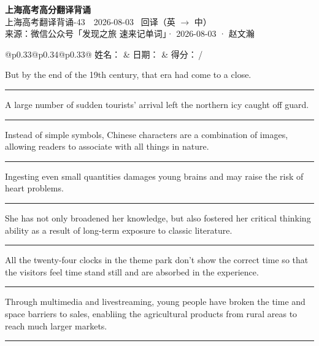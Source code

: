 \documentclass[11pt,a4paper]{article}
\newcommand{\num}[1]{\makebox[1.9em][r]{#1.}\hspace{0.3em}}
\newcommand{\wline}{\noindent\rule{\linewidth}{0.4pt}}
\begin{document}
\pagestyle{plain}
\begin{center}
{\LARGE\bfseries 上海高考高分翻译背诵 }\\[0.25em]
{\large 上海高考翻译背诵-43　2026-08-03 \quad\ 回译（英 $\to$ 中）}\\[0.35em]
{\footnotesize 来源：微信公众号「发现之旅 速来记单词」· 2026-08-03 · 赵文瀚}
\end{center}

\vspace{0.4em}
\noindent\begin{tabular}{@{}p{0.33\textwidth}@{}p{0.34\textwidth}@{}p{0.33\textwidth}@{}}
姓名：\underline{\hspace{2.0cm}} & 日期：\underline{\hspace{2.0cm}} & 得分：\underline{\hspace{1.4cm}}\,/ \\
\end{tabular}

\vspace{0.5em}

\vspace{0.8em}
\num{1}But by the end of the 19th century, that era had come to a close.

\vspace{0.25em}

\wline

\num{2}A large number of sudden tourists’ arrival left the northern icy caught off guard.

\vspace{0.25em}

\wline

\num{3}Instead of simple symbols, Chinese characters are a combination of images, allowing readers to associate with all things in nature.

\vspace{0.25em}

\wline

\num{4}Ingesting even small quantities damages young brains and may raise the risk of heart problems.

\vspace{0.25em}

\wline

\num{5}She has not only broadened her knowledge, but also fostered her critical thinking ability as a result of long-term exposure to classic literature.

\vspace{0.25em}

\wline

\num{6}All the twenty-four clocks in the theme park don’t show the correct time so that the visitors feel time stand still and are absorbed in the experience.

\vspace{0.25em}

\wline

\num{7}Through multimedia and livestreaming, young people have broken the time and space barriers to sales, enabliing the agricultural products from rural areas to reach much larger markets.

\vspace{0.25em}

\wline
\end{document}
